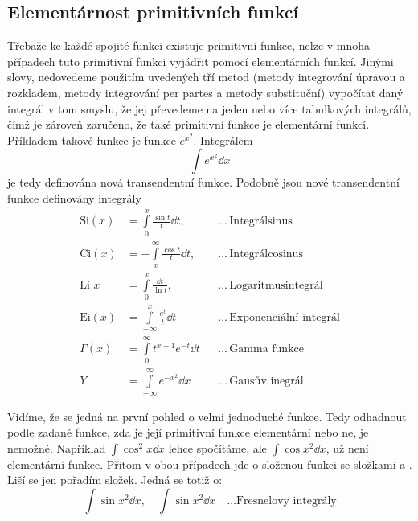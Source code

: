     \subsection{Elementárnost primitivních funkcí}\label{mai:IchapVIIsecIIssecII} 
      Třebaže ke každé spojité funkci existuje primitivní funkce, nelze v mnoha případech tuto
      primitivní funkci vyjádřit pomocí elementárních funkcí. Jinými slovy, nedovedeme použitím
      uvedených tří metod (metody integrování úpravou a rozkladem, metody integrování per partes a
      metody substituční) vypočítat daný integrál v tom smyslu, že jej převedeme na jeden nebo více
      tabulkových integrálů, čímž je zároveň zaručeno, že také primitivní funkce je elementární
      funkcí. Příkladem takové funkce je funkce
      \(e^{x^2}\). Integrálem
      \begin{equation*}
        \int e^{x^2}\dd{x}
      \end{equation*}
      je tedy definována nová transendentní funkce. Podobně jsou nové transendentní funkce
      definovány integrály
      \begin{align*}
        \text{Si}(x) 
          &= \int\limits_0^x     \frac{\sin t}{t}\dd{t},&&\ldots\,\text{Integrálsinus}           \\
        \text{Ci}(x) 
          &=-\int\limits_x^\infty\frac{\cos t}{t}\dd{t},&&\ldots\,\text{Integrálcosinus}         \\
        \text{Li }x 
          &= \int\limits_0^x     \frac{\dd{t}}{\ln t},  &&\ldots\,\text{Logaritmusintegrál}      \\
        \text{Ei}(x) 
          &= \int\limits_{-\infty}^x \frac{e^t}{t}\dd{t}&&\ldots\,\text{Exponenciální integrál}  \\
        \Gamma(x) 
          &= \int\limits^\infty_0 t^{x-1}{e^{-t}}\dd{t}&&\ldots\,\text{Gamma funkce}             \\
        Y
          &= \int\limits^\infty_{-\infty}{e^{-x^2}}\dd{x}&&\ldots\,\text{Gausův inegrál}     
      \end{align*}

      Vidíme, že se jedná na první pohled o velmi jednoduché funkce. Tedy odhadnout podle
       zadané funkce, zda je její primitivní funkce elementární nebo ne, je nemožné.
      Například \(\int\cos^2x\dd{x}\) lehce spočítáme, ale \(\int\cos x^2\dd{x}\), už není
      elementární funkce. Přitom v obou případech jde o složenou funkci se složkami  a . Liší se jen pořadím složek. Jedná se totiž o: 
      \[\int\sin{x^2}\dd{x},\quad\int\sin{x^2}\dd{x}\quad\ldots\text{Fresnelovy integrály}\]



